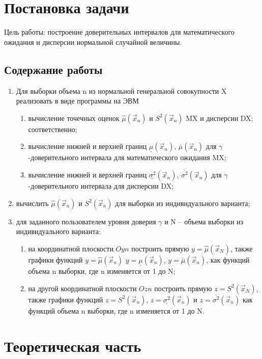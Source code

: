 \documentclass[a4paper, 14pt, unknownkeysallowed]{extreport}
\begin{document}

\setcounter{page}{2}

\chapter{Постановка задачи}
Цель работы: построение доверительных интервалов для математического ожидания и дисперсии нормальной случайной величины.
\section{Содержание работы}
\begin{enumerate}
\item Для выборки объема n из нормальной генеральной совокупности X реализовать в виде программы на ЭВМ
	\begin{enumerate}
		\item вычисление точечных оценок $\hat{\mu}(\vec{x}_n)$ и $S^2(\vec{x}_n)$
		MX и дисперсии DX; соответственно;
		\item вычисление нижней и верхней границ $\underline{{\mu}}(\vec{x}_n)$, $\overline{{\mu}}(\vec{x}_n)$ для $\gamma$-доверительного интервала для
		математического ожидания MX;
		\item вычисление нижней и верхней границ 
		$\underline{\sigma^2}(\vec{x}_n)$, 
		$\overline{\sigma^2}(\vec{x}_n)$ для $\gamma$-доверительного интервала для
		дисперсии DX;
	\end{enumerate}
	\item вычислить $\hat{\mu}(\vec{x}_n)$ и $S^2(\vec{x}_n)$ для выборки из индивидуального варианта;
	\item для заданного пользователем уровня доверия $\gamma$ и N – объема выборки из индивидуального варианта:
	\begin{enumerate}
		\item на координатной плоскости $Oyn$ построить прямую $y=\hat{\mu}(\vec{x}_N)$, также графики функций $y=\hat{\mu}(\vec{x}_n)$
			$y=\underline{{\mu}}(\vec{x}_n)$, $y=\overline{{\mu}}(\vec{x}_n)$,  как функций объема n выборки, где n изменяется от 1 до N;
		\item на другой координатной плоскости $Ozn$ построить прямую $z = S^2(\vec{x}_N)$, также графики
			функций $z = S^2(\vec{x}_n)$, $z = \underline{\sigma^2}(\vec{x}_n)$
			и $z = \overline{\sigma^2}(\vec{x}_n)$ как функций объема n выборки, где n
			изменяется от 1 до N.
	\end{enumerate}
\end{enumerate}

\chapter{Теоретическая часть}
\end{document}
